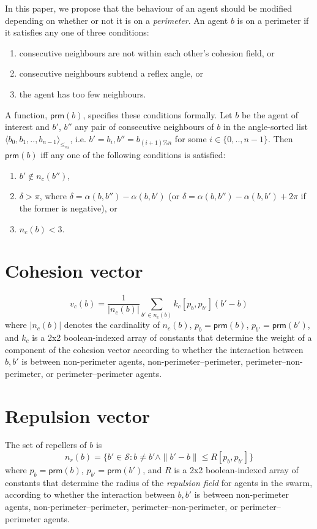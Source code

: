 \documentclass[12pt,a4paper]{article}
\newcommand{\pangle}{\mathit{\alpha}}
\newcommand{\leqaz}[3]{#2 \leq_{\pangle_#1} #3}
\newcommand{\angleordered}[2]{\langle #2 \rangle_{\leqaz{#1}{}{}}}
\newcommand{\prm}{\mathsf{prm}}
\newcommand{\kc}{\mathit{k_c}}
\newcommand{\rb}{\mathit{R}}
\begin{document}
In this paper, we propose that the behaviour of an agent should be modified
depending on whether or not it is on a \emph{perimeter}. An agent $b$ is on a
perimeter if it satisfies any one of three conditions:
\begin{enumerate}
	\item consecutive neighbours are not within each other's cohesion field, or
	\item consecutive neighbours subtend a reflex angle, or
	\item the agent has too few neighbours.
\end{enumerate}
A function, $\prm(b)$, specifies these conditions formally. Let $b$ be the
agent of interest and $b'$, $b''$ any pair of consecutive neighbours of $b$ in
the angle-sorted list $\angleordered{b}{b_0, b_1, .., b_{n-1}}$, i.e. $b' =
b_i, b'' = b_{(i+1)\%n}$ for some $i \in \{0,..,n-1\}$.  Then $\prm(b)$ iff any
one of the following conditions is satisfied:
\begin{enumerate}
\item $b' \notin n_c(b'')$,
\item $\delta > \pi$, where $\delta = \pangle(b, b'') - \pangle(b, b')$ (or $\delta = \pangle(b, b'') - \pangle(b, b') + 2\pi$ if the former is negative), or
\item $n_c(b) < 3$.
\end{enumerate}



\section{Cohesion vector}
\begin{equation}\label{eq:coh2}
	v_c(b) = \frac{1}{|n_c(b)|} \sum_{b' \in n_c(b)} \kc[p_b, p_{b'}] (b' - b)
\end{equation}
where $|n_c(b)|$ denotes the cardinality of $n_c(b)$, $p_b = \prm(b)$, $p_{b'} 
= \prm(b')$, and 
$\kc$ is a 2x2 boolean-indexed array of constants that determine the weight
of a component of the cohesion vector according to
whether the interaction between $b,b'$ is between non-perimeter agents,
non-perimeter--perimeter, perimeter--non-perimeter, or perimeter--perimeter
agents.


\section{Repulsion vector}
The set of repellers of $b$ is
\begin{equation}\label{eq:rep1}
	n_r(b) = \{b' \in \mathcal{S} : b \neq b' \wedge \|b' - b\| \leq \rb[p_b,p_{b'}]\}
\end{equation}
where $p_b = \prm(b)$, $p_{b'} = \prm(b')$, and $\rb$ is a 2x2 boolean-indexed
array of constants that determine the radius of the \emph{repulsion field} for
agents in the swarm, according to whether the interaction between $b,b'$ is
between non-perimeter agents, non-perimeter--perimeter,
perimeter--non-perimeter, or perimeter--perimeter agents.
\end{document}
